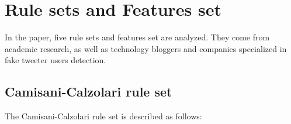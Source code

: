 \documentclass[a4paper,11pt]{article}
\begin{document}
\section{Rule sets and Features set}
In the paper, five rule sets and features set are analyzed. They come from  academic research, as well as technology bloggers and companies specialized in fake tweeter users detection.\\

\begin{comment}
====> Là j'ai défini un truc, mais je me rends compte que l'auteur du paper appelle aussi "features" des trucs que j'appelerais "rules".

We define a rule as a function that takes a non boolean value as an input and returns a boolean output based on an arbitrary criteria. For instance: "the user has at least 30 friends", the number 30 being arbitrary.\\

While a rule is a function, a feature is a value, boolean or otherwise. For example, a feature could be "the number of friends" of the user, without specifying whether it should be bigger or smaller than a certain number, as that will be for the \textit{machine learning} algorithms to decide.
\end{comment}

\subsection{Camisani-Calzolari rule set}
The Camisani-Calzolari rule set is described as follows:
\end{document}
